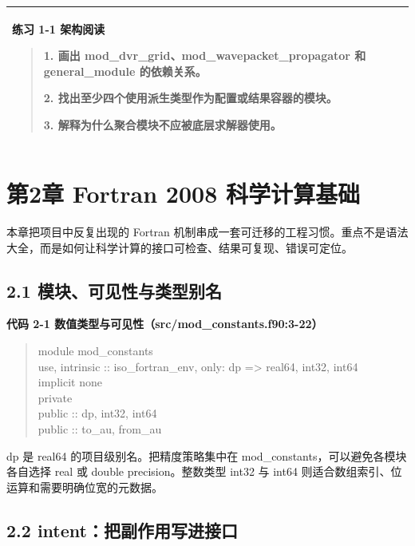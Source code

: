 \documentclass[UTF8,openany,11pt,fontset=fandol]{ctexbook}
\begin{document}
\begin{longtable}[]{@{}l@{}}
\toprule
\endhead
\begin{minipage}[t]{0.97\columnwidth}\raggedright
\textbf{练习 1-1 架构阅读}

\begin{quote}
1. 画出 mod\_dvr\_grid、mod\_wavepacket\_propagator 和 general\_module
的依赖关系。

2. 找出至少四个使用派生类型作为配置或结果容器的模块。

3. 解释为什么聚合模块不应被底层求解器使用。
\end{quote}\strut
\end{minipage}\tabularnewline
\bottomrule
\end{longtable}

\chapter{第2章 Fortran 2008 科学计算基础}\label{ux7b2c2ux7ae0-fortran-2008-ux79d1ux5b66ux8ba1ux7b97ux57faux7840}

本章把项目中反复出现的 Fortran
机制串成一套可迁移的工程习惯。重点不是语法大全，而是如何让科学计算的接口可检查、结果可复现、错误可定位。

\section{\texorpdfstring{\textbf{2.1
模块、可见性与类型别名}}{2.1 模块、可见性与类型别名}}\label{ux6a21ux5757ux53efux89c1ux6027ux4e0eux7c7bux578bux522bux540d}

\textbf{代码 2-1 数值类型与可见性（src/mod\_constants.f90:3-22）}

\begin{quote}
module mod\_constants\\
use, intrinsic :: iso\_fortran\_env, only: dp =\textgreater{} real64,
int32, int64\\
implicit none\\
private\\
public :: dp, int32, int64\\
public :: to\_au, from\_au
\end{quote}

dp 是 real64 的项目级别名。把精度策略集中在
mod\_constants，可以避免各模块各自选择 real 或 double
precision。整数类型 int32 与 int64
则适合数组索引、位运算和需要明确位宽的元数据。

\section{\texorpdfstring{\textbf{2.2
intent：把副作用写进接口}}{2.2 intent：把副作用写进接口}}\label{intentux628aux526fux4f5cux7528ux5199ux8fdbux63a5ux53e3}
\end{document}
